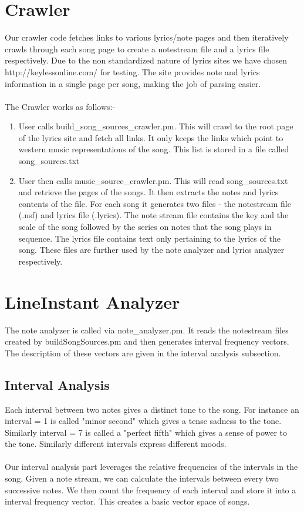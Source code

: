 \documentclass[letterpaper, 11pt]{article}
\begin{document}
\section*{Crawler}
Our crawler code fetches links to various lyrics/note pages and then iteratively crawls through each song page to create a notestream file and a lyrics file respectively. Due to the non standardized nature of lyrics sites we have chosen http://keylessonline.com/ for testing. The site provides note and lyrics information in a single page per song, making the job of parsing easier. \\\\
The Crawler works as follows:-
\begin{enumerate}
\item User calls build\_song\_sources\_crawler.pm. This will crawl to the root page of the lyrics site and fetch all links. It only keeps the links which point to western music representations of the song. This list is stored in a file called song\_sources.txt
\item User then calls music\_source\_crawler.pm. This will read song\_sources.txt and retrieve the pages of the songs. It then extracts the notes and lyrics contents of the file. For each song it generates two files - the notestream file (.nsf) and lyrics file (.lyrics). The note stream file contains the key and the scale of the song followed by the series on notes that the song plays in sequence. The lyrics file contains text only pertaining to the lyrics of the song. These files are further used by the note analyzer and lyrics analyzer respectively. 
\end{enumerate}

\section*{LineInstant Analyzer}
The note analyzer is called via note\_analyzer.pm. It reads the notestream files created by buildSongSources.pm and then generates interval frequency vectors. The description of these vectors are given in the interval analysis subsection.
\subsection*{Interval Analysis}
Each interval between two notes gives a distinct tone to the song. For instance an interval = 1  is called "minor second" which gives a tense sadness to the tone. Similarly interval = 7 is called a "perfect fifth" which gives a sense of power to the tone. Similarly different intervals express different moods. \\\\
Our interval analysis part leverages the relative frequencies of the intervals in the song. Given a note stream, we can calculate the intervals between every two successive notes. We then count the frequency of each interval and store it into a interval frequency vector. This creates a basic vector space of songs. 
\end{document}

